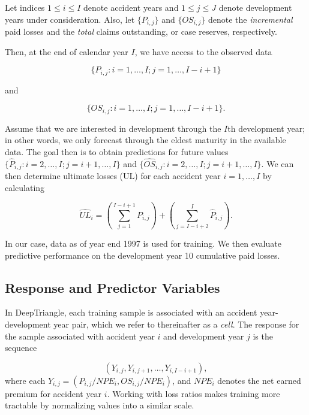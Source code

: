 \documentclass[risks,article,submit,moreauthors,pdftex]{mdpi}
\begin{document}
Let indices \(1 \leq i \leq I\) denote accident years and \(1 \leq j \leq J\) denote development years under consideration. Also, let \(\{P_{i,j}\}\) and \(\{OS_{i,j}\}\) denote the \emph{incremental} paid losses and the \emph{total} claims outstanding, or case reserves, respectively.

Then, at the end of calendar year \(I\), we have access to the observed data

\begin{equation}
\{P_{i,j}: i = 1, \dots, I; j = 1, \dots, I - i + 1\}
\end{equation}

and

\begin{equation}
\{OS_{i,j}: i = 1, \dots, I; j = 1, \dots, I - i + 1\}.
\end{equation}

Assume that we are interested in development through the \(I\)th development year; in other words, we only forecast through the eldest maturity in the available data. The goal then is to obtain predictions for future values \(\{\widehat{P}_{i,j}: i = 2, \dots, I; j = i+1, \dots, I\}\) and \(\{\widehat{OS}_{i,j}: i = 2, \dots, I; j = i+1, \dots, I\}\). We can then determine ultimate losses (UL) for each accident year \(i = 1, \dots, I\) by calculating

\begin{equation}
\widehat{UL}_i = \left(\sum_{j = 1}^{I - i + 1} P_{i,j}\right) + \left(\sum_{j = I - i + 2}^I \widehat{P}_{i,j}\right).
\end{equation}

In our case, data as of year end 1997 is used for training. We then evaluate predictive performance on the development year 10 cumulative paid losses.

\hypertarget{response-and-predictor-variables}{%
\subsection{Response and Predictor Variables}\label{response-and-predictor-variables}}

In DeepTriangle, each training sample is associated with an accident year-development year pair, which we refer to thereinafter as a \emph{cell}. The response for the sample associated with accident year \(i\) and development year \(j\) is the sequence

\begin{equation}
(Y_{i,j},Y_{i,j+1},\dots,Y_{i,I - i + 1}), 
\end{equation}
where each \(Y_{i,j} = (P_{i,j} / NPE_{i}, OS_{i,j} / NPE_{i})\), and \(NPE_{i}\) denotes the net earned premium for accident year \(i\). Working with loss ratios makes training more tractable by normalizing values into a similar scale.
\end{document}
